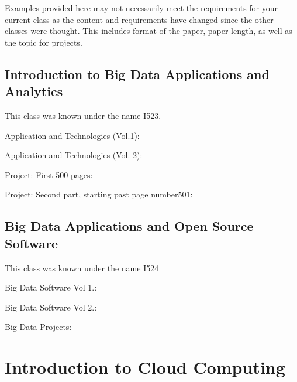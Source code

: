 \begin{NOTE}
  Examples provided here may not necessarily meet the requirements for
  your current class as the content and requirements have changed
  since the other classes were thought. This includes format of the
  paper, paper length, as well as the topic for projects.
\end{NOTE}

\subsection{Introduction to Big Data Applications and Analytics}

This class was known under the name I523.


Application and Technologies (Vol.1):

Application and Technologies (Vol. 2):

Project: First 500 pages:

Project: Second part, starting past page number501:

\subsection{Big Data Applications and Open Source Software}

This class was known under the name I524

Big Data Software Vol 1.:

Big Data Software Vol 2.:

Big Data Projects:

\section{Introduction to Cloud Computing}

